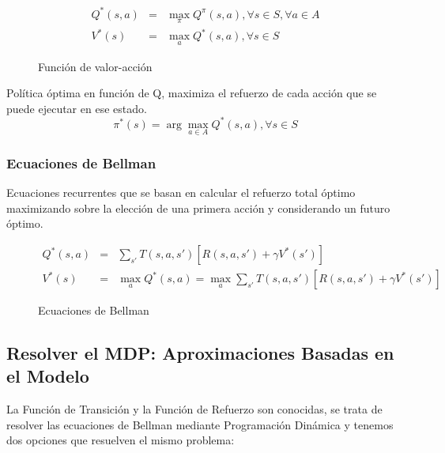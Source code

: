 \documentclass[12pt, twoside, openright]{report} %
\begin{document}
\begin{figure}[H]
  \begin{eqnarray*}
    Q^* (s, a) &=& \max_\pi Q^\pi (s, a), \forall s \in S, \forall a \in A \\
    V^* (s) &=& \max_a Q^* (s, a), \forall s \in S
  \end{eqnarray*} 
  \captionsetup{justification=centering}
  \caption{Función de valor-acción}
\end{figure}

Política óptima en función de Q, maximiza el refuerzo de cada acción que se puede ejecutar en ese estado.
$$\pi^* (s) = \arg \max_{a \in A} Q^* (s,a), \forall s \in S$$
\pagebreak
\subsubsection{Ecuaciones de Bellman}
Ecuaciones recurrentes que se basan en calcular el refuerzo total óptimo maximizando sobre la elección de una primera acción y considerando un futuro óptimo.
\begin{figure}[H]
  \begin{eqnarray*}
    Q^* (s, a) &=& \sum _{s'} T(s, a, s') [R(s, a, s') + \gamma V^* (s')]\\
    V^* (s) &=& \max_a Q^*(s, a) = \max _a \sum _{s'} T(s, a, s') [R(s, a, s') + \gamma V^* (s')]
  \end{eqnarray*} 
  \captionsetup{justification=centering}
  \caption{Ecuaciones de Bellman}
\end{figure}

\subsection{Resolver el MDP: Aproximaciones Basadas en el Modelo}
La Función de Transición y la Función de Refuerzo son conocidas, se trata de resolver las ecuaciones de Bellman mediante Programación Dinámica y tenemos dos opciones que resuelven el mismo problema:
\end{document}
